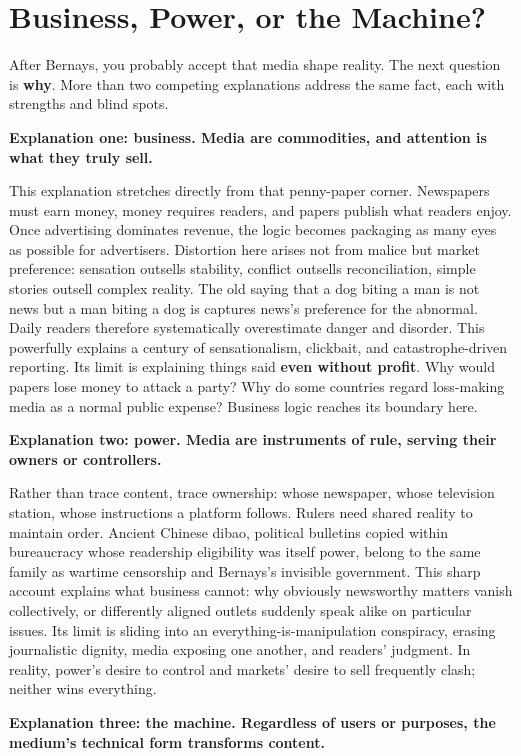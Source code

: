 \section{Business, Power, or the Machine?}
After Bernays, you probably accept that media shape reality. The next question is \textbf{why}. More than two competing explanations address the same fact, each with strengths and blind spots.

\textbf{Explanation one: business. Media are commodities, and attention is what they truly sell.}

This explanation stretches directly from that penny-paper corner. Newspapers must earn money, money requires readers, and papers publish what readers enjoy. Once advertising dominates revenue, the logic becomes packaging as many eyes as possible for advertisers. Distortion here arises not from malice but market preference: sensation outsells stability, conflict outsells reconciliation, simple stories outsell complex reality. The old saying that a dog biting a man is not news but a man biting a dog is captures news's preference for the abnormal. Daily readers therefore systematically overestimate danger and disorder. This powerfully explains a century of sensationalism, clickbait, and catastrophe-driven reporting. Its limit is explaining things said \textbf{even without profit}. Why would papers lose money to attack a party? Why do some countries regard loss-making media as a normal public expense? Business logic reaches its boundary here.

\textbf{Explanation two: power. Media are instruments of rule, serving their owners or controllers.}

Rather than trace content, trace ownership: whose newspaper, whose television station, whose instructions a platform follows. Rulers need shared reality to maintain order. Ancient Chinese dibao, political bulletins copied within bureaucracy whose readership eligibility was itself power, belong to the same family as wartime censorship and Bernays's invisible government. This sharp account explains what business cannot: why obviously newsworthy matters vanish collectively, or differently aligned outlets suddenly speak alike on particular issues. Its limit is sliding into an everything-is-manipulation conspiracy, erasing journalistic dignity, media exposing one another, and readers' judgment. In reality, power's desire to control and markets' desire to sell frequently clash; neither wins everything.

\textbf{Explanation three: the machine. Regardless of users or purposes, the medium's technical form transforms content.}

